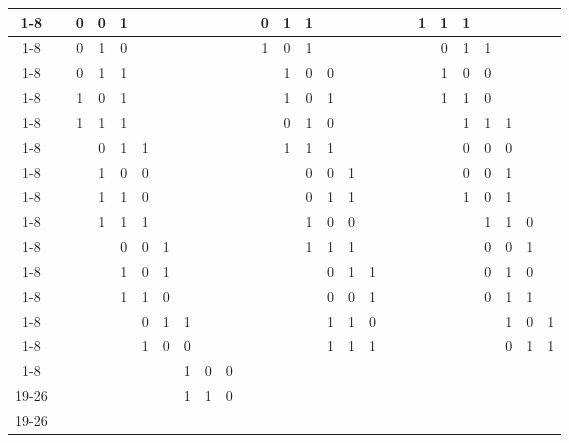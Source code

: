 \documentclass[12pt, a4paper]{article}
\begin{document}
\begin{table}[tbp]
\begin{tabular}{|c|c|c|c|c|c|c|c|c|c|c|c|c|c|c|c|c|c|c|c|c|c|c|c|c|c|}
\cline{1-8}                                                        \cline{10-17}
\cline{19-26}
&&0&0&1&&&& &&&0&1&1&&&& &&1&1&1&&&&\\
\cline{1-8}                                                        \cline{10-17}
\cline{19-26}
&&0&1&0&&&& &&&1&0&1&&&& &&&0&1&1&&&\\
\cline{1-8}                                                        \cline{10-17}
\cline{19-26}
&&0&1&1&&&& &&&&1&0&0&&& &&&1&0&0&&&\\
\cline{1-8}                                                        \cline{10-17}
\cline{19-26}
&&1&0&1&&&& &&&&1&0&1&&& &&&1&1&0&&&\\
\cline{1-8}                                                        \cline{10-17}
\cline{19-26}
&&1&1&1&&&& &&&&0&1&0&&& &&&&1&1&1&&\\
\cline{1-8}                                                        \cline{10-17}
\cline{19-26}
&&&0&1&1&&& &&&&1&1&1&&& &&&&0&0&0&&\\
\cline{1-8}                                                        \cline{10-17}
\cline{19-26}
&&&1&0&0&&& &&&&&0&0&1&& &&&&0&0&1&&\\
\cline{1-8}                                                        \cline{10-17}
\cline{19-26}
&&&1&1&0&&& &&&&&0&1&1&& &&&&1&0&1&&\\
\cline{1-8}                                                        \cline{10-17}
\cline{19-26}
&&&1&1&1&&& &&&&&1&0&0&& &&&&&1&1&0&\\
\cline{1-8}                                                        \cline{10-17}
\cline{19-26}
&&&&0&0&1&& &&&&&1&1&1&& &&&&&0&0&1&\\
\cline{1-8}                                                        \cline{10-17}
\cline{19-26}
&&&&1&0&1&& &&&&&&0&1&1& &&&&&0&1&0&\\
\cline{1-8}                                                        \cline{10-17}
\cline{19-26}
&&&&1&1&0&& &&&&&&0&0&1& &&&&&0&1&1&\\
\cline{1-8}                                                        \cline{10-17}
\cline{19-26}
&&&&&0&1&1& &&&&&&1&1&0& &&&&&&1&0&1\\
\cline{1-8}                                                        \cline{10-17}
\cline{19-26}
&&&&&1&0&0& &&&&&&1&1&1& &&&&&&0&1&1\\
\cline{1-8}                                                        \cline{10-17}
\cline{19-26}
\multicolumn{17}{}{}   &&&&&&&1&0&0\\
\cline{19-26}
\multicolumn{17}{}{}   &&&&&&&1&1&0\\
\cline{19-26}
\end{tabular}
\end{table}
\end{document}
